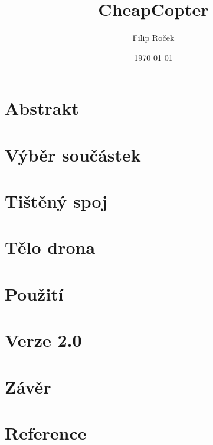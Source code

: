\documentclass[11pt,a4paper,openright]{report}
\title{CheapCopter}
\author{Filip Roček}
\date{\today}
\begin{document}




\tableofcontents

\chapter{Abstrakt}


\chapter{Výběr součástek}


\chapter{Tištěný spoj}


\chapter{Tělo drona}


\chapter{Použití}


\chapter{Verze 2.0}


\chapter{Závěr}


\newpage

\chapter{Reference}

\makeatletter
\renewcommand{\chapter}{\@gobbletwo}
\makeatother

\printbibliography
\end{document}
